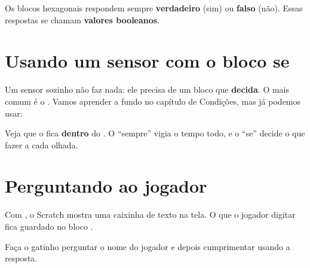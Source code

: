 \begin{vocabulario}
Os blocos hexagonais respondem sempre \textbf{verdadeiro} (sim) ou \textbf{falso} (não). Essas respostas se chamam \textbf{valores booleanos}.
\end{vocabulario}

\section{Usando um sensor com o bloco se}

Um sensor sozinho não faz nada: ele precisa de um bloco que \textbf{decida}. O mais comum é o . Vamos aprender a fundo no capítulo de Condições, mas já podemos usar:

\begin{codigo}
\begin{pilha}
\sbcend
\sbcend
\end{pilha}
\end{codigo}

\begin{dica}
Veja que o  fica \textbf{dentro} do . O ``sempre'' vigia o tempo todo, e o ``se'' decide o que fazer a cada olhada.
\end{dica}

\section{Perguntando ao jogador}

Com , o Scratch mostra uma caixinha de texto na tela. O que o jogador digitar fica guardado no bloco .

\begin{missao}
Faça o gatinho perguntar o nome do jogador e depois cumprimentar usando a resposta.
\end{missao}

\begin{codigo}
\begin{pilha}
\end{pilha}
\end{codigo}

